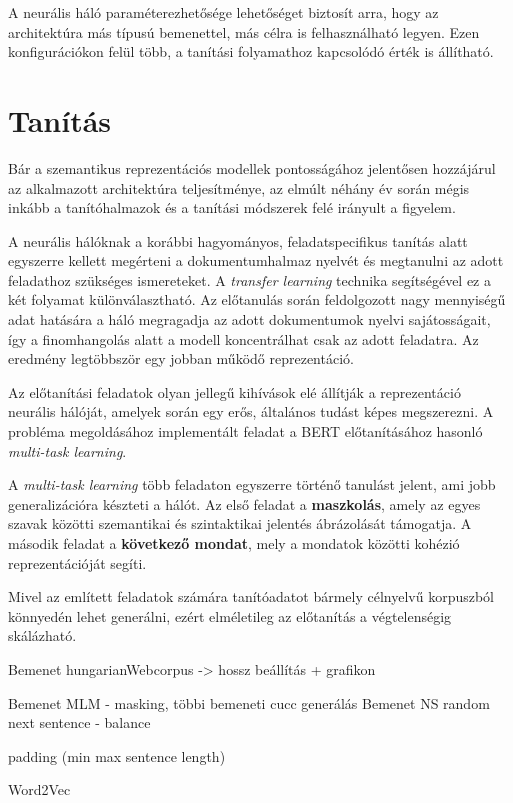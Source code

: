 A neurális háló paraméterezhetősége lehetőséget biztosít arra, hogy az architektúra más típusú bemenettel, más célra is felhasználható legyen. Ezen konfigurációkon felül több, a tanítási folyamathoz kapcsolódó érték is állítható.

\section{Tanítás}

Bár a szemantikus reprezentációs modellek pontosságához jelentősen hozzájárul az alkalmazott architektúra teljesítménye, az elmúlt néhány év során mégis inkább a tanítóhalmazok és a tanítási módszerek felé irányult a figyelem.

A neurális hálóknak a korábbi hagyományos, feladatspecifikus tanítás alatt egyszerre kellett megérteni a dokumentumhalmaz nyelvét és megtanulni az adott feladathoz szükséges ismereteket. A \textit{transfer learning} technika segítségével ez a két folyamat különválasztható. Az előtanulás során feldolgozott nagy mennyiségű adat hatására a háló megragadja az adott dokumentumok nyelvi sajátosságait, így a finomhangolás alatt a modell koncentrálhat csak az adott feladatra. Az eredmény legtöbbször egy jobban működő reprezentáció.

Az előtanítási feladatok olyan jellegű kihívások elé állítják a reprezentáció neurális hálóját, amelyek során egy erős, általános tudást képes megszerezni. A probléma megoldásához implementált feladat a BERT előtanításához hasonló \textit{multi-task learning}. 

A \textit{multi-task learning} több feladaton egyszerre történő tanulást jelent, ami jobb generalizációra készteti a hálót. Az első feladat a \textbf{maszkolás}, amely az egyes szavak közötti szemantikai és szintaktikai jelentés ábrázolását támogatja. A második feladat a \textbf{következő mondat}, mely a mondatok közötti kohézió reprezentációját segíti.

Mivel az említett feladatok számára tanítóadatot bármely célnyelvű korpuszból könnyedén lehet generálni, ezért elméletileg az előtanítás a végtelenségig skálázható.

Bemenet hungarianWebcorpus -> hossz beállítás + grafikon

Bemenet MLM - masking, többi bemeneti cucc generálás
Bemenet NS random next sentence - balance

padding (min max sentence length)

Word2Vec 






